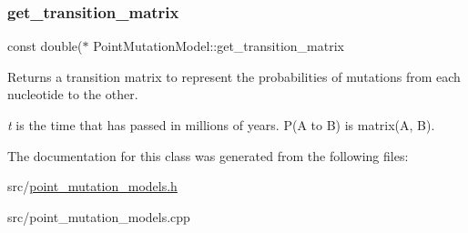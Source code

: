 \subsubsection{\texorpdfstring{get\+\_\+transition\+\_\+matrix}{get\_transition\_matrix}}
{\footnotesize\ttfamily const double($\ast$ Point\+Mutation\+Model\+::get\+\_\+transition\+\_\+matrix}



Returns a transition matrix to represent the probabilities of mutations from each nucleotide to the other. 

{\itshape t} is the time that has passed in millions of years. P(\+A to B) is matrix(\+A, B). 

The documentation for this class was generated from the following files\+:\begin{DoxyCompactItemize}
\item 
src/\hyperlink{point__mutation__models_8h}{point\+\_\+mutation\+\_\+models.\+h}\item 
src/point\+\_\+mutation\+\_\+models.\+cpp\end{DoxyCompactItemize}
